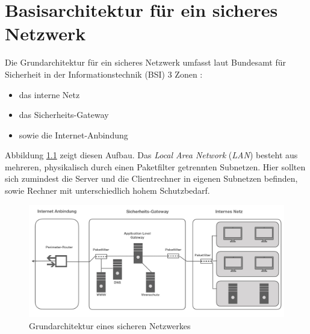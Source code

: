 \chapter{Basisarchitektur für ein sicheres Netzwerk}
\label{K1}
Die Grundarchitektur für ein sicheres Netzwerk umfasst laut Bundesamt für Sicherheit in der Informationstechnik (BSI) 3 Zonen \cite{isi-lana}: 
\begin{itemize}
	\item das interne Netz 
	\item das Sicherheits-Gateway
	\item sowie die Internet-Anbindung	
\end{itemize}

Abbildung \ref{grundarch} zeigt diesen Aufbau. Das \emph{Local Area Network} (\emph{LAN}) besteht aus mehreren, physikalisch durch einen Paketfilter getrennten Subnetzen. Hier sollten sich zumindest die Server und die Clientrechner in eigenen Subnetzen befinden, sowie Rechner mit unterschiedlich hohem Schutzbedarf. 

\begin{figure}[h]
	\includegraphics[width=\linewidth]{grundarchitektur}
	\caption{Grundarchitektur eines sicheren Netzwerkes}
	\label{grundarch}
\end{figure}


